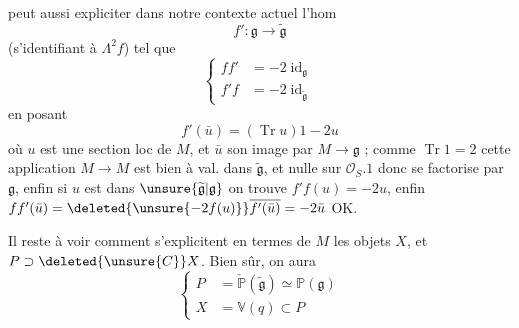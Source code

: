  peut aussi expliciter dans notre contexte actuel l'hom
\[
f':\mathfrak g\longrightarrow\widetilde{\mathfrak g}\tag*{(53)}
\]
(s'identifiant à $\Lambda^2f$) tel que
\[
\left\{\begin{aligned}
ff'&=-2\operatorname{id}_{\mathfrak g}\\
f'f&=-2\operatorname{id}_{\widetilde{\mathfrak g}}
\end{aligned}\right.\tag*{(54)}
\]
en posant
\[
f'(\bar u)=(\operatorname{Tr}u)1-2u\tag*{(55)}
\]
où $u$ est une section loc de $M$, et $\bar u$ son image par $M\to\mathfrak g$ ; comme $\operatorname{Tr}1=2$ cette application  $M\to M$ est bien à val. dans $\widetilde{\mathfrak g}$, et nulle sur $\mathcal O_S.1$ donc se factorise par $\mathfrak g$, enfin si $u$ est dans $\unsure{\widetilde{\mathfrak g}|\mathfrak g}$ on trouve $f'f(u)=-2u$, enfin $ff'(\bar u)=\deleted{\unsure{-2f(u)}}\overline{f'(\bar u)}=-2\bar u$ OK.

Il reste à voir comment s'explicitent en termes de $M$ les objets $X$, et $P\supset\deleted{\unsure{C}}X$. Bien sûr, on aura
\[
\left\{\begin{aligned}
P&=\check{\mathbb P}(\widetilde{\mathfrak g})\simeq\mathbb P(\mathfrak g)\\
X&=\mathbb V(q)\subset P
\end{aligned}\right.\tag*{(56)}
\]
